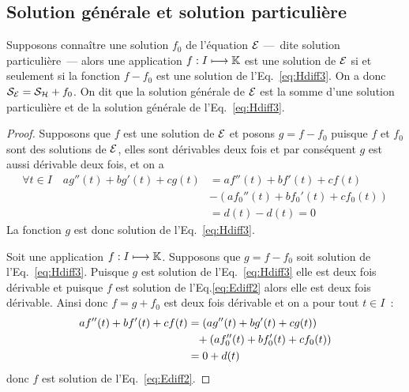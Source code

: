 \subsection{Solution générale et solution particulière}
\label{subsec:solutiongeneraleetsolutionpart}
\begin{theo}
Supposons connaître une solution $f_0$ de l'équation $\mathcal{E}$ ---~dite solution particulière~--- alors une application $f:I \longmapsto \mathbb{K}$ est une solution de $\mathcal{E}$ si et seulement si la fonction $f-f_0$ est une solution de l'Eq.~\eqref{eq:Hdiff3}. On a donc $\mathcal{S}_{\mathcal{E}}=\mathcal{S}_{\mathcal{H}} + f_0$. On dit que la solution générale de $\mathcal{E}$ est la somme d'une solution particulière et de la solution générale de l'Eq.~\eqref{eq:Hdiff3}.
\end{theo}
\begin{proof}
  Supposons que $f$ est une solution de $\mathcal{E}$ et posons $g=f-f_0$ puisque $f$ et $f_0$ sont des solutions de $\mathcal{E}$, elles sont dérivables deux fois et par conséquent $g$ est aussi dérivable deux fois, et on a
  \begin{align}
    \forall t \in I \quad ag''(t)+bg'(t)+cg(t) &= af''(t)+bf'(t)+cf(t) \\ &- (af_0''(t)+bf_0'(t)+cf_0(t))\\ &= d(t)-d(t)=0
  \end{align}
La fonction $g$ est donc solution de l'Eq.~\eqref{eq:Hdiff3}.

Soit une application $f:I \longmapsto \mathbb{K}$. Supposons que $g=f-f_0$ soit solution de l'Eq.~\eqref{eq:Hdiff3}. Puisque $g$ est solution de l'Eq.~\eqref{eq:Hdiff3} elle est deux fois dérivable et puisque $f$ est solution de l'Eq.\eqref{eq:Ediff2} alors elle est deux fois dérivable. Ainsi donc $f=g+f_0$ est deux fois dérivable et on a pour tout $t \in I$~:
\begin{align}
  af''(t)+bf'(t)+cf(t)&=(ag''(t)+bg'(t)+cg(t))\notag\\ &\phantom{=}+(af_0''(t)+bf_0'(t)+cf_0(t))\\ &=0+d(t) 
\end{align}
donc $f$ est solution de l'Eq.~\eqref{eq:Ediff2}.
\end{proof}
